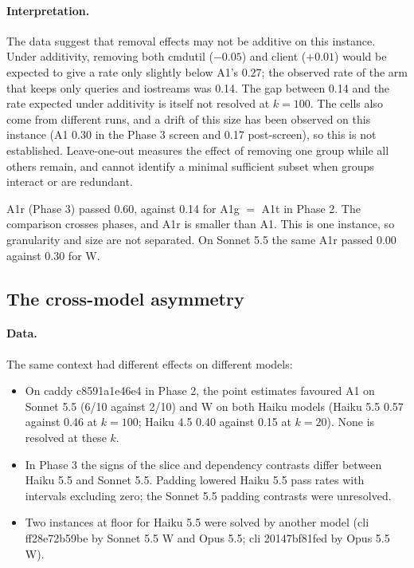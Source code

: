 \documentclass[10pt]{article}
\begin{document}
\paragraph{Interpretation.} The data suggest that removal effects may not be additive on this instance. Under additivity, removing both cmdutil ($-0.05$) and client ($+0.01$) would be expected to give a rate only slightly below A1's 0.27; the observed rate of the arm that keeps only queries and iostreams was 0.14. The gap between 0.14 and the rate expected under additivity is itself not resolved at $k=100$. The cells also come from different runs, and a drift of this size has been observed on this instance (A1 0.30 in the Phase 3 screen and 0.17 post-screen), so this is not established. Leave-one-out measures the effect of removing one group while all others remain, and cannot identify a minimal sufficient subset when groups interact or are redundant.

A1r (Phase 3) passed 0.60, against 0.14 for A1g $=$ A1t in Phase 2. The comparison crosses phases, and A1r is smaller than A1. This is one instance, so granularity and size are not separated. On Sonnet 5.5 the same A1r passed 0.00 against 0.30 for W.

\subsection{The cross-model asymmetry}

\paragraph{Data.} The same context had different effects on different models:
\begin{itemize}
\item On caddy c8591a1e46e4 in Phase 2, the point estimates favoured A1 on Sonnet 5.5 (6/10 against 2/10) and W on both Haiku models (Haiku 5.5 0.57 against 0.46 at $k=100$; Haiku 4.5 0.40 against 0.15 at $k=20$). None is resolved at these $k$.
\item In Phase 3 the signs of the slice and dependency contrasts differ between Haiku 5.5 and Sonnet 5.5. Padding lowered Haiku 5.5 pass rates with intervals excluding zero; the Sonnet 5.5 padding contrasts were unresolved.
\item Two instances at floor for Haiku 5.5 were solved by another model (cli ff28e72b59be by Sonnet 5.5 W and Opus 5.5; cli 20147bf81fed by Opus 5.5 W).
\end{itemize}
\end{document}
